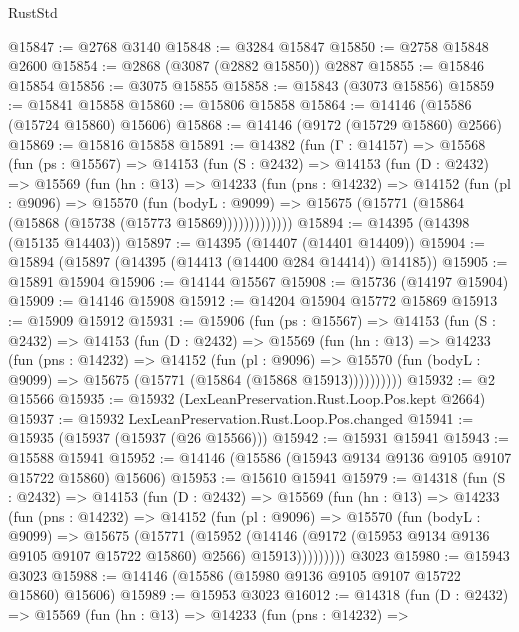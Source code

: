 \begin{lexlean}{RustStd}
\begin{coremodule}
@15847 := @2768 @3140
@15848 := @3284 @15847
@15850 := @2758 @15848 @2600
@15854 := @2868 (@3087 (@2882 @15850)) @2887
@15855 := @15846 @15854
@15856 := @3075 @15855
@15858 := @15843 (@3073 @15856)
@15859 := @15841 @15858
@15860 := @15806 @15858
@15864 := @14146 (@15586 (@15724 @15860) @15606)
@15868 := @14146 (@9172 (@15729 @15860) @2566)
@15869 := @15816 @15858
@15891 := @14382
    (fun (Γ : @14157) =>
    @15568
      (fun (ps : @15567) =>
      @14153
        (fun (S : @2432) =>
        @14153
          (fun (D : @2432) =>
          @15569
            (fun (hn : @13) =>
            @14233
              (fun (pns : @14232) =>
              @14152
                (fun (pl : @9096) =>
                @15570
                  (fun (bodyL : @9099) =>
                  @15675 (@15771 (@15864 (@15868 (@15738 (@15773 @15869)))))))))))))
@15894 := @14395 (@14398 (@15135 @14403))
@15897 := @14395 (@14407 (@14401 @14409))
@15904 := @15894 (@15897 (@14395 (@14413 (@14400 @284 @14414)) @14185))
@15905 := @15891 @15904
@15906 := @14144 @15567
@15908 := @15736 (@14197 @15904)
@15909 := @14146 @15908
@15912 := @14204 @15904 @15772 @15869
@15913 := @15909 @15912
@15931 := @15906
    (fun (ps : @15567) =>
    @14153
      (fun (S : @2432) =>
      @14153
        (fun (D : @2432) =>
        @15569
          (fun (hn : @13) =>
          @14233
            (fun (pns : @14232) =>
            @14152
              (fun (pl : @9096) =>
              @15570 (fun (bodyL : @9099) => @15675 (@15771 (@15864 (@15868 @15913))))))))))
@15932 := @2 @15566
@15935 := @15932 (LexLeanPreservation.Rust.Loop.Pos.kept @2664)
@15937 := @15932 LexLeanPreservation.Rust.Loop.Pos.changed
@15941 := @15935 (@15937 (@15937 (@26 @15566)))
@15942 := @15931 @15941
@15943 := @15588 @15941
@15952 := @14146 (@15586 (@15943 @9134 @9136 @9105 @9107 @15722 @15860) @15606)
@15953 := @15610 @15941
@15979 := @14318
    (fun (S : @2432) =>
    @14153
      (fun (D : @2432) =>
      @15569
        (fun (hn : @13) =>
        @14233
          (fun (pns : @14232) =>
          @14152
            (fun (pl : @9096) =>
            @15570
              (fun (bodyL : @9099) =>
              @15675
                (@15771
                  (@15952
                    (@14146
                      (@9172 (@15953 @9134 @9136 @9105 @9107 @15722 @15860) @2566)
                      @15913)))))))))
    @3023
@15980 := @15943 @3023
@15988 := @14146 (@15586 (@15980 @9136 @9105 @9107 @15722 @15860) @15606)
@15989 := @15953 @3023
@16012 := @14318
    (fun (D : @2432) =>
    @15569
      (fun (hn : @13) =>
      @14233
        (fun (pns : @14232) =>

\end{coremodule}
\end{lexlean}
